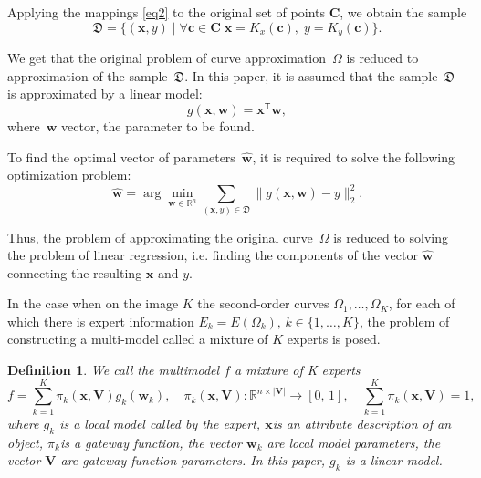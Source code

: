 \documentclass[12pt, twoside]{article}
\newtheorem{definition}{Definition}[section]
\numberwithin{equation}{section}
\begin{document}
Applying the mappings \eqref{eq2} to the original set of points $\mathbf {C} $, we obtain the sample
\begin{equation}
\label{eq4}
    \mathfrak{D} = \{(\mathbf{x}, y) \; | \; \forall \mathbf{c} \in \mathbf{C} \; \mathbf{x} = K_x(\mathbf{c}), \; y = K_y(\mathbf{c}) \}.
\end{equation}

We get that the original problem of curve approximation~$\Omega$ is reduced to approximation of the sample~$\mathfrak {D}$. In this paper, it is assumed that the sample~$\mathfrak {D}$ is approximated by a linear model:
\begin{equation}
	g(\mathbf{x}, \mathbf{w}) = \mathbf{x}^\mathsf{T} \mathbf{w},
\end{equation} 
where~$\mathbf{w}$ vector, the parameter to be found.

To find the optimal vector of parameters~$\hat {\mathbf {w}}$, it is required to solve the following optimization problem:
\begin{equation}
	\hat{\mathbf{w}} = \arg\min_{\mathbf{w}\in\mathbb{R}^n} \sum_{\left(\mathbf{x}, y\right) \in \mathfrak{D}}\|g(\mathbf{x}, \mathbf{w}) - y \|_2^2.
\end{equation} 

Thus, the problem of approximating the original curve~$\Omega$ is reduced to solving the problem of linear regression, i.e. finding the components of the vector $\hat{\mathbf {w}}$ connecting the resulting $\mathbf {x}$ and $y$.

In the case when on the image $K$ the second-order curves  $\Omega_1, \dots, \Omega_K$, for each of which there is expert information $E_k = E (\Omega_k), \, k \in \{1, \dots , K\}$, the problem of constructing a multi-model called a mixture of $K$ experts is posed.
\begin{definition}
We call the multimodel $ f $ a mixture of K experts
\begin{equation}
	f = \sum\limits_{k = 1}^{K}\pi_k(\mathbf{x}, \mathbf{V})g_k(\mathbf{w}_k),  \quad \pi_k(\mathbf{x}, \mathbf{V}): \mathbb{R}^{n\times |\mathbf{V}|} \rightarrow [0, \, 1], \quad \sum\limits_{k = 1}^{K}\pi_k(\mathbf{x}, \mathbf{V}) = 1, 
\end{equation}
where $g_k$ is a local model called by the expert, $\mathbf{x}$is an attribute description of an object, $\pi_k$is a gateway function, the vector $\mathbf{w}_k$ are local model parameters, the vector $\mathbf{V}$ are gateway function parameters. In this paper, $g_k$ is a linear model.
\end{definition}
\end{document}
